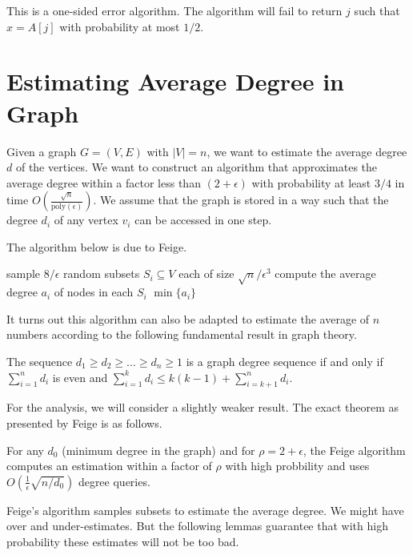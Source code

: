 \begin{theorem}
    This is a one-sided error algorithm. The algorithm will fail to return $j$ such that $x = A[j]$ with probability at most $1/2$.
\end{theorem}

\section{Estimating Average Degree in Graph}

Given a graph $G = (V,E)$ with $|V| = n$, we want to estimate the average degree $d$ of the vertices. We want to construct an algorithm that approximates the average degree within a factor less than $(2 + \epsilon)$ with probability at least $3/4$ in time $O\left( \frac{\sqrt{n}}{\mathrm{poly}(\epsilon)} \right)$. We assume that the graph is stored in a way such that the degree $d_i$ of any vertex $v_i$ can be accessed in one step.

The algorithm below is due to Feige.

\begin{codebox}
    \li sample $8 / \epsilon$ random subsets $S_i \subseteq V$ each of size $\sqrt{n} / \epsilon^3$
    \li compute the average degree $a_i$ of nodes in each $S_i$
    \li \Return $\min \{a_i\}$
\end{codebox}

It turns out this algorithm can also be adapted to estimate the average of $n$ numbers according to the following fundamental result in graph theory.

\begin{theorem}
    The sequence $d_1 \geq d_2 \geq \ldots \geq d_n \geq 1$ is a graph degree sequence if and only if $\sum_{i=1}^n d_i$ is even and $\sum_{i=1}^k d_i \leq k(k-1) + \sum_{i=k+1}^n d_i$.
\end{theorem}

For the analysis, we will consider a slightly weaker result. The exact theorem as presented by Feige is as follows.

\begin{theorem}
    For any $d_0$ (minimum degree in the graph) and for $\rho = 2 + \epsilon$, the Feige algorithm computes an estimation within a factor of $\rho$ with high probbility and uses $O\left( \frac{1}{\epsilon} \sqrt{n / d_0} \right)$ degree queries.
\end{theorem}

Feige's algorithm samples subsets to estimate the average degree. We might have over and under-estimates. But the following lemmas guarantee that with high probability these estimates will not be too bad.


